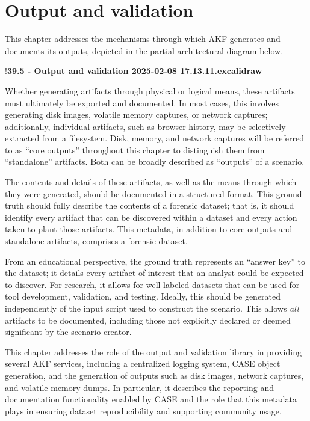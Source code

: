 \documentclass[letterpaper,12pt]{report}
\begin{document}
\chapter{Output and validation}\label{chapter-five}

This chapter addresses the mechanisms through which AKF generates and
documents its outputs, depicted in the partial architectural diagram
below.

!\textbf{39.5 - Output and validation 2025-02-08 17.13.11.excalidraw}

Whether generating artifacts through physical or logical means, these
artifacts must ultimately be exported and documented. In most cases,
this involves generating disk images, volatile memory captures, or
network captures; additionally, individual artifacts, such as browser
history, may be selectively extracted from a filesystem. Disk, memory,
and network captures will be referred to as ``core outputs'' throughout
this chapter to distinguish them from ``standalone'' artifacts. Both can
be broadly described as ``outputs'' of a scenario.

The contents and details of these artifacts, as well as the means
through which they were generated, should be documented in a structured
format. This ground truth should fully describe the contents of a
forensic dataset; that is, it should identify every artifact that can be
discovered within a dataset and every action taken to plant those
artifacts. This metadata, in addition to core outputs and standalone
artifacts, comprises a forensic dataset.

From an educational perspective, the ground truth represents an ``answer
key'' to the dataset; it details every artifact of interest that an
analyst could be expected to discover. For research, it allows for
well-labeled datasets that can be used for tool development, validation,
and testing. Ideally, this should be generated independently of the
input script used to construct the scenario. This allows \emph{all}
artifacts to be documented, including those not explicitly declared or
deemed significant by the scenario creator.

This chapter addresses the role of the output and validation library in
providing several AKF services, including a centralized logging system,
CASE object generation, and the generation of outputs such as disk
images, network captures, and volatile memory dumps. In particular, it
describes the reporting and documentation functionality enabled by CASE
and the role that this metadata plays in ensuring dataset
reproducibility and supporting community usage.
\end{document}

